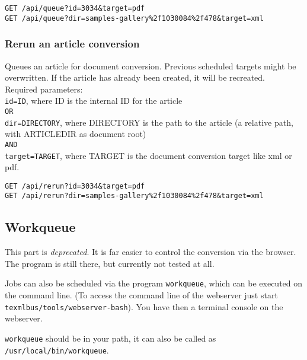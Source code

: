 \documentclass[a4paper]{article}
\begin{document}
\begin{verbatim}
GET /api/queue?id=3034&target=pdf
GET /api/queue?dir=samples-gallery%2f1030084%2f478&target=xml
\end{verbatim}

\subsubsection{Rerun an article  conversion}
Queues an article for document conversion. Previous scheduled targets might be overwritten.
If the article has already been created, it will be recreated. \\

Required parameters:\\
\texttt{id=ID}, where ID is the internal ID for the article\\
\texttt{OR}\\
\texttt{dir=DIRECTORY}, where DIRECTORY is the path to the article (a relative path, with ARTICLEDIR as document root)\\
\texttt{AND}\\
\texttt{target=TARGET}, where TARGET is the document conversion target like xml or pdf.

\begin{verbatim}
GET /api/rerun?id=3034&target=pdf
GET /api/rerun?dir=samples-gallery%2f1030084%2f478&target=xml
\end{verbatim}

\subsection{Workqueue}

This part is \textit{deprecated}. It is far easier to control the conversion via the browser. 
The program is still there, but currently not tested at all.
 
Jobs can also be scheduled via the program \texttt{workqueue}, which can be executed on the command line. (To access the command line of the webserver just start \texttt{texmlbus/tools/webserver-bash}). You have then a terminal console on the webserver.

\nopagebreak
\texttt{workqueue} should be in your path, it can also be called as  \texttt{/usr/local/bin/workqueue}.
\end{document}
